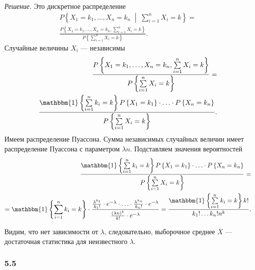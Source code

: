 \textit{Решение.} Это дискретное распределение
\begin{equation*}
  \begin{split}
    P \left\{ X_1 = k_1, \dotsc, X_n = k_n \; \middle| \; \sum \limits_{i = 1}^n X_i = k \right\} = \\
    \frac{P \left\{ X_1 = k_1, \dotsc, X_n = k_n, \sum \limits_{i = 1}^n X_i = k \right\} }{P \left\{ \sum \limits_{i = 1}^n X_i = k \right\} }.
  \end{split}
\end{equation*}
Случайные величины $X_i$ --- независимы
\begin{equation*}
  \begin{split}
    \frac{P \left\{ X_1 = k_1, \dotsc, X_n = k_n, \sum \limits_{i = 1}^n X_i = k \right\} }{P \left\{ \sum \limits_{i = 1}^n X_i = k \right\} } = \\
    \frac{ \mathbbm{1} \left\{ \sum \limits_{i = 1}^n k_i = k \right\} P \left\{ X_1 = k_1 \right\} \cdot \dotsc \cdot P \left\{ X_n = k_n \right\} }{P \left\{ \sum \limits_{i = 1}^n X_i = k \right\} }.
  \end{split}
\end{equation*}
Имеем распределение Пуассона.
Сумма независимых случайных величин имеет распределение Пуассона с параметром $ \lambda n$.
Подставляем значения вероятностей
\begin{equation*}
  \begin{split}
    \frac{ \mathbbm{1} \left\{ \sum \limits_{i = 1}^n k_i = k \right\} P \left\{ X_1 = k_1 \right\} \cdot \dotsc \cdot P \left\{ X_n = k_n \right\} }{P \left\{ \sum \limits_{i = 1}^n X_i = k \right\} } = \\
    = \mathbbm{1} \left\{ \sum \limits_{i = 1}^n k_i = k \right\} \cdot
    \frac{ \frac{ \lambda^{k_1}}{k_1!} \cdot e^{- \lambda } \cdot \dotsc \cdot \frac{ \lambda^{k_n}}{k_n!} \cdot e^{- \lambda }}{ \frac{ \left( \lambda n \right)^k}{k!} \cdot e^{- \lambda }} =
    \frac{ \mathbbm{1} \left\{ \sum \limits_{i = 1}^n k_i = k \right\} k!}{k_1! \dotsc k_n! n^k}.
  \end{split}
\end{equation*}

Видим, что нет зависимости от $ \lambda $, следовательно, выборочное среднее $ \overline{X}$ ---
достаточная статистика для неизвестного $ \lambda $.

\subsubsection{5.5}

